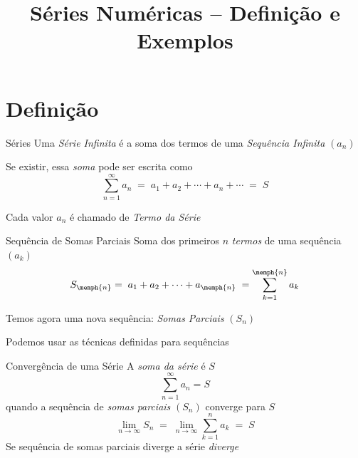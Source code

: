 
\usepackage{integracao_e_series}
\usepackage{cancel}

\title{Séries Numéricas -- Definição e Exemplos}



\addtitle

\section{Definição}

\begin{frame}{Séries}
    Uma \emph{Série Infinita} é a soma dos termos de uma \emph{Sequência Infinita} $(a_n)$

    \pause
    \vspace{\baselineskip}
    Se existir, essa \emph{soma} pode ser escrita como
    \[
      \sum_{n=1}^\infty a_n
      \;=\; a_1 + a_2 + \cdots + a_n + \cdots
      \;=\; S
    \]

    \pause
    Cada valor $a_n$ é chamado de \emph{Termo da Série}

\end{frame}

\begin{frame}{Sequência de Somas Parciais}
    Soma dos primeiros $n$ \emph{termos} de uma sequência $(a_k)$
    \[
      S_{\memph{n}}
      = \; a_1 + a_2 + \cdots + a_{\memph{n}} \;
      = \sum_{k=1}^{\memph{n}} a_k
    \]

    \pause
    Temos agora uma nova sequência: \emph{Somas Parciais} $(S_n)$

    \pause
    \vspace{\baselineskip}
    Podemos usar as técnicas definidas para sequências

\end{frame}

\begin{frame}{Convergência de uma Série}
    A \emph{soma da série} é $S$
    \[
      \sum_{n=1}^\infty a_n = S
    \]
    quando a sequência de \emph{somas parciais} $(S_n)$ converge para $S$
    \pause
    \[
      \lim_{n\to\infty} S_n
      \;=\; \lim_{n\to\infty} \sum_{k=1}^n a_k
      \;=\; S
    \]
    \pause
    Se sequência de somas parciais diverge a série \emph{diverge}
\end{frame}

